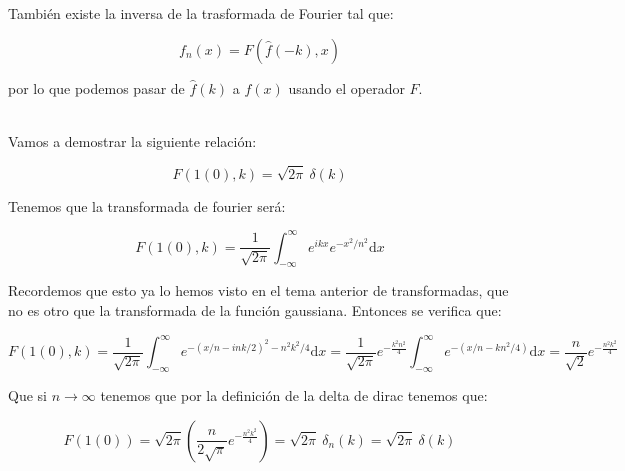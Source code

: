 \documentclass[12pt,a4paper]{book}
\newcommand{\parentesis}[1]{\left( #1  \right)}
\newcommand{\D}{\mathrm{d}}
\newcommand{\inti}{\int_{-\infty}^{\infty}}
\newcommand{\hatf}{\widehat{f}}
\begin{document}
También existe la inversa de la trasformada de Fourier tal que:

\begin{equation}
f_n (x) = F(\hatf (-k), x)
\end{equation}

por lo que podemos pasar de $\hatf(k)$ a $f(x)$ usando el operador $F$. \\


\hrulefill \\

Vamos a demostrar la siguiente relación:

\begin{equation}
F(1(0),k) = \sqrt{2 \pi} \ \delta (k)
\end{equation}

Tenemos que la transformada de fourier será:

$$ F(1(0),k) = \dfrac{1}{\sqrt{2 \pi}} \inti e^{ikx} e^{-x^2/n^2} \D x $$

Recordemos que esto ya lo hemos visto en el tema anterior de transformadas, que no es otro que la transformada de la función gaussiana. Entonces se verifica que:

$$ F(1(0),k) = \dfrac{1}{\sqrt{2 \pi}} \inti e^{-(x/n-ink/2)^2-n^2k^2/4} \D x = \dfrac{1}{\sqrt{2 \pi}} e^{-\frac{k^2 n^2}{4}} \inti e^{-(x/n-k n^2 / 4)} \D x = \dfrac{n}{\sqrt{2}} e^{-\frac{n^2 k^2}{4}}  $$

Que si $n \rightarrow \infty$ tenemos que por la definición de la delta de dirac tenemos que:

$$ F(1(0)) = \sqrt{2 \pi} \parentesis{\dfrac{n}{ 2 \sqrt{\pi }} e^{-\frac{n^2 k^2}{4}} }  = \sqrt{2 \pi} \ \delta_n (k) = \sqrt{2 \pi} \ \delta(k) $$


\hrulefill 
\end{document}

